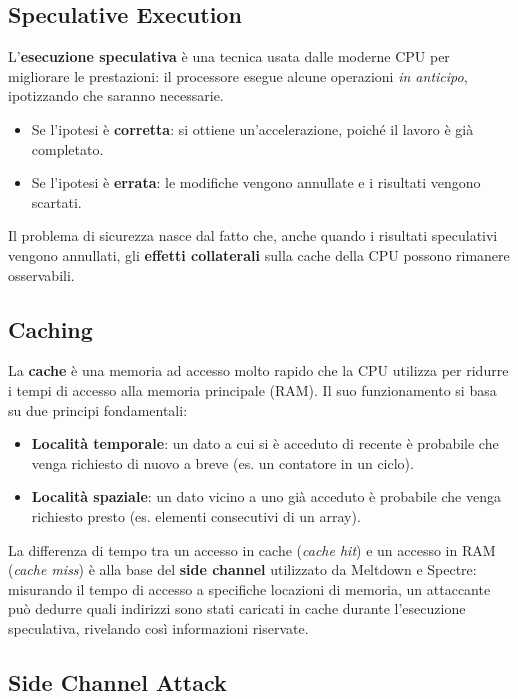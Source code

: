 \documentclass{article}
\begin{document}
\subsection*{Speculative Execution}

L'\textbf{esecuzione speculativa} è una tecnica usata dalle moderne CPU per migliorare le prestazioni: il processore esegue alcune operazioni \textit{in anticipo}, ipotizzando che saranno necessarie.

\begin{itemize}
    \item Se l'ipotesi è \textbf{corretta}: si ottiene un'accelerazione, poiché il lavoro è già completato.
    \item Se l'ipotesi è \textbf{errata}: le modifiche vengono annullate e i risultati vengono scartati.
\end{itemize}

Il problema di sicurezza nasce dal fatto che, anche quando i risultati speculativi vengono annullati, gli \textbf{effetti collaterali} sulla cache della CPU possono rimanere osservabili.

\subsection*{Caching}

La \textbf{cache} è una memoria ad accesso molto rapido che la CPU utilizza per ridurre i tempi di accesso alla memoria principale (RAM). Il suo funzionamento si basa su due principi fondamentali:

\begin{itemize}
    \item \textbf{Località temporale}: un dato a cui si è acceduto di recente è probabile che venga richiesto di nuovo a breve (es. un contatore in un ciclo).
    \item \textbf{Località spaziale}: un dato vicino a uno già acceduto è probabile che venga richiesto presto (es. elementi consecutivi di un array).
\end{itemize}

La differenza di tempo tra un accesso in cache (\textit{cache hit}) e un accesso in RAM (\textit{cache miss}) è alla base del \textbf{side channel} utilizzato da Meltdown e Spectre: misurando il tempo di accesso a specifiche locazioni di memoria, un attaccante può dedurre quali indirizzi sono stati caricati in cache durante l'esecuzione speculativa, rivelando così informazioni riservate.


\subsection*{Side Channel Attack}
\end{document}
